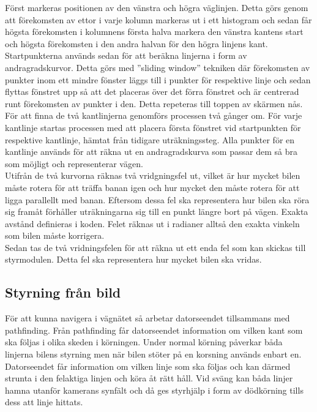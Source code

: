 \documentclass[10pt,oneside,swedish]{lips}
\begin{document}
\noindent
Först markeras positionen av den vänstra och högra väglinjen. Detta görs genom att förekomsten av ettor i varje kolumn markeras ut i ett histogram och sedan får högsta förekomsten i kolumnens första halva markera den vänstra kantens start och högsta förekomsten i den andra halvan för den högra linjens kant.\\

\noindent
Startpunkterna används sedan för att beräkna linjerna i form av andragradskurvor. Detta görs med ''sliding window'' tekniken där förekomsten av punkter inom ett mindre fönster läggs till i punkter för respektive linje och sedan flyttas fönstret upp så att det placeras över det förra fönstret och är centrerad runt förekomsten av punkter i den. Detta repeteras till toppen av skärmen nås. För att finna de två kantlinjerna genomförs processen två gånger om. För varje kantlinje startas processen med att placera första fönstret vid startpunkten för respektive kantlinje, hämtat från tidigare uträkningssteg. Alla punkter för en kantlinje används för att räkna ut en andragradskurva som passar dem så bra som möjligt och representerar vägen.\\

\noindent
Utifrån de två kurvorna räknas två vridgningsfel ut, vilket är hur mycket bilen måste rotera för att träffa banan igen och hur mycket den måste rotera för att ligga parallellt med banan. Eftersom dessa fel ska representera hur bilen ska röra sig framåt förhåller uträkningarna sig till en punkt längre bort på vägen. Exakta avstånd definieras i koden. Felet räknas ut i radianer alltså den exakta vinkeln som bilen måste korrigera.\\

\noindent
Sedan tas de två vridningsfelen för att räkna ut ett enda fel som kan skickas till styrmodulen. Detta fel ska representera hur mycket bilen ska vridas.

\subsection{Styrning från bild}
För att kunna navigera i vägnätet så arbetar datorseendet tillsammans med pathfinding. Från pathfinding får datorseendet information om vilken kant som ska följas i olika skeden i körningen. Under normal körning påverkar båda linjerna bilens styrning men när bilen stöter på en korsning används enbart en. Datorseendet får information om vilken linje som ska följas och kan därmed strunta i den felaktiga linjen och köra åt rätt håll. Vid sväng kan båda linjer hamna utanför kamerans synfält och då ges styrhjälp i form av dödkörning tills dess att linje hittats.
\end{document}
